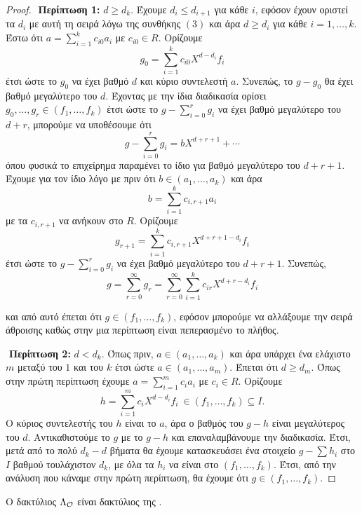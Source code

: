 \begin{proof}
    $ $\newline
    \textbf{Περίπτωση 1:} $d\geq d_k$. Έχουμε $d_i \leq d_{i+1}$ για κάθε $i$, εφόσον έχουν οριστεί τα $d_i$ με αυτή τη σειρά λόγω της συνθήκης $(3)$ και άρα $d\geq d_i$ για κάθε $i=1,\ldots, k$. Έστω ότι $a = \sum\limits_{i=1}^k c_{i0}a_i$ με $c_{i0} \in R$. Ορίζουμε
    $$g_0 = \sum\limits_{i=1}^k c_{i0} X^{d-d_i}f_i$$
    έτσι ώστε το $g_0$ να έχει βαθμό $d$ και κύριο συντελεστή $a$. Συνεπώς, το $g-g_0$ θα έχει βαθμό μεγαλύτερο του $d$. Έχοντας με την 
    ίδια διαδικασία ορίσει $g_0,\ldots,g_r \in (f_1,\ldots, f_k)$ έτσι ώστε το $g-\sum\limits_{i=0}^r g_i$ να έχει βαθμό μεγαλύτερο του 
    $d+r$, μπορούμε να υποθέσουμε ότι
    $$g-\sum\limits_{i=0}^r g_i = bX^{d+r+1} + \cdots $$
    όπου φυσικά το επιχείρημα παραμένει το ίδιο για βαθμό μεγαλύτερο του $d+r+1$. Έχουμε για τον ίδιο λόγο με πριν ότι $b \in (a_1,\ldots, a_k)$ και άρα 
    $$b = \sum\limits_{i=1}^k c_{i,r+1}a_i$$
    με τα $c_{i,r+1}$ να ανήκουν στο $R$. Ορίζουμε
    $$g_{r+1} = \sum\limits_{i=1}^k c_{i,r+1} X^{d+r+1-d_i} f_i$$
    έτσι ώστε το $g-\sum\limits_{i=0}^r g_i$ να έχει βαθμό μεγαλύτερο του $d+r+1$. Συνεπώς,
    $$g = \sum\limits_{r=0}^\infty g_r = \sum\limits_{r=0}^\infty \sum\limits_{i=1}^k c_{ir}X^{d+r-d_i} f_i$$

    \noindent και από αυτό έπεται ότι $g\in (f_1,\ldots,f_k)$, εφόσον μπορούμε να αλλάξουμε την σειρά άθροισης καθώς στην μια περίπτωση είναι πεπερασμένο το πλήθος.
    
    $ $\newline
    \textbf{Περίπτωση 2:} $d<d_k$. Όπως πριν, $a \in (a_1,\ldots,a_k)$ και άρα υπάρχει ένα ελάχιστο $m$ μεταξύ του $1$ και του $k$ έτσι ώστε $a \in (a_1,\ldots, a_m)$. Έπεται ότι $d\geq d_m$. Όπως στην πρώτη περίπτωση έχουμε $a = \sum\limits_{i=1}^m c_i a_i$ με $c_i \in R$. Ορίζουμε
    $$h = \sum\limits_{i=1}^m c_i X^{d-d_i} f_i \ \in (f_1,\ldots, f_k) \subseteq I.$$
    Ο κύριος συντελεστής του $h$ είναι το $a$, άρα ο βαθμός του $g-h$ είναι μεγαλύτερος του $d$. Αντικαθιστούμε το $g$ με το $g-h$ και επαναλαμβάνουμε την διαδικασία. Έτσι, μετά από το πολύ $d_k - d$ βήματα θα έχουμε κατασκευάσει ένα στοιχείο $g-\sum h_i$ στο $I$ βαθμού τουλάχιστον $d_k$, με όλα τα $h_i$ να είναι στο $(f_1,\ldots, f_k)$. Έτσι, από την ανάλυση που κάναμε στην πρώτη περίπτωση, θα έχουμε ότι $g\in (f_1,\ldots, f_k)$.
\end{proof}

\begin{cor} Ο δακτύλιος $\Lambda_\mathcal{O}$ είναι δακτύλιος της .
\end{cor}




